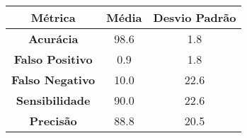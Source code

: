 \begin{tabular}{|c|c|c|}%
\hline%
\textbf{Métrica}&\textbf{Média}&\textbf{Desvio Padrão}\\%
\hline%
\textbf{Acurácia}&98.6&1.8\\%
\hline%
\textbf{Falso Positivo}&0.9&1.8\\%
\hline%
\textbf{Falso Negativo}&10.0&22.6\\%
\hline%
\textbf{Sensibilidade}&90.0&22.6\\%
\hline%
\textbf{Precisão}&88.8&20.5\\%
\hline%
\end{tabular}
